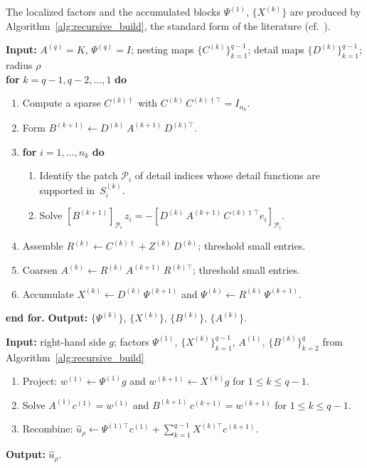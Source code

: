 The localized factors and the accumulated blocks $\Psi^{(1)}$,
$\{X^{(k)}\}$ are produced by Algorithm~\ref{alg:recursive_build},
the standard form of the literature (cf.~\cite{budni2019}).

\begin{algorithm}[t]
\caption{Localized OAW construction (cf.~\cite{budni2019})}
\label{alg:recursive_build}
\textbf{Input:} $A^{(q)} = K$, $\Psi^{(q)} = I$; nesting maps
$\{C^{(k)}\}_{k=1}^{q-1}$; detail maps $\{D^{(k)}\}_{k=1}^{q-1}$; radius
$\rho$\\[4pt]
\textbf{for} $k = q-1, q-2, \ldots, 1$ \textbf{do}
\begin{enumerate}
  \item[1.] Compute a sparse $C^{(k)\dagger}$ with
    $C^{(k)}\,C^{(k)\dagger\top} = I_{n_k}$.
  \item[2.] Form $B^{(k+1)} \gets D^{(k)}\,A^{(k+1)}\,D^{(k)\top}$.
  \item[3.] \textbf{for} $i = 1, \ldots, n_k$ \textbf{do}
  \begin{enumerate}
    \item[(a)] Identify the patch $\mathcal{P}_i$ of detail indices whose
      detail functions are supported in~$S^{(k)}_i$.
    \item[(b)] Solve $[B^{(k+1)}]_{\mathcal{P}_i}\, z_i =
      -[D^{(k)}\,A^{(k+1)}\,C^{(k)\dagger\top} e_i]_{\mathcal{P}_i}$.
  \end{enumerate}
  \item[4.] Assemble $R^{(k)} \gets C^{(k)\dagger} + Z^{(k)}\,D^{(k)}$;
    threshold small entries.
  \item[5.] Coarsen $A^{(k)} \gets R^{(k)}\,A^{(k+1)}\,R^{(k)\top}$;
    threshold small entries.
  \item[6.] Accumulate $X^{(k)} \gets D^{(k)}\,\Psi^{(k+1)}$ and
    $\Psi^{(k)} \gets R^{(k)}\,\Psi^{(k+1)}$.
\end{enumerate}
\textbf{end for.}  \textbf{Output:} $\{\Psi^{(k)}\}$, $\{X^{(k)}\}$,
$\{B^{(k)}\}$, $\{A^{(k)}\}$.
\end{algorithm}

\begin{algorithm}[t]
\caption{Direct solve with the localized factorization}
\label{alg:direct_solve}
\textbf{Input:} right-hand side $g$; factors $\Psi^{(1)}$,
$\{X^{(k)}\}_{k=1}^{q-1}$, $A^{(1)}$, $\{B^{(k)}\}_{k=2}^{q}$ from
Algorithm~\ref{alg:recursive_build}\\[4pt]
\begin{enumerate}
  \item[1.] Project: $w^{(1)} \gets \Psi^{(1)} g$ and
    $w^{(k+1)} \gets X^{(k)} g$ for $1 \leq k \leq q-1$.
  \item[2.] Solve $A^{(1)} c^{(1)} = w^{(1)}$ and
    $B^{(k+1)}\, c^{(k+1)} = w^{(k+1)}$ for $1 \leq k \leq q-1$.
  \item[3.] Recombine: $\hat{u}_\rho \gets \Psi^{(1)\top} c^{(1)}
    + \sum_{k=1}^{q-1} X^{(k)\top} c^{(k+1)}$.
\end{enumerate}
\textbf{Output:} $\hat{u}_\rho$.
\end{algorithm}


